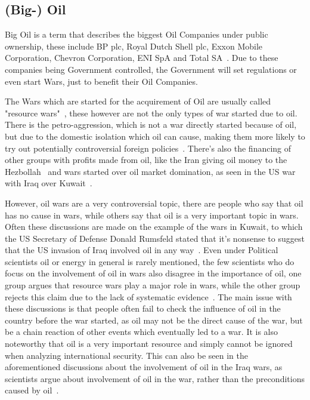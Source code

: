 \subsection{(Big-) Oil}
Big Oil is a term that describes the biggest Oil Companies under public ownership, these  include BP plc, Royal Dutch Shell plc, Exxon Mobile Corporation, Chevron Corporation, ENI SpA and Total SA~\autocite{financial-dictionary-big-oil}. Due to these companies being Government controlled, the Government will set regulations or even start Wars, just to benefit their Oil Companies.

The Wars which are started for the acquirement of Oil are usually called "resource wars"~\autocite{belfercenter-oil-conflict}, these however are not the only types of war started due to oil. There is the petro-aggression, which is not a war directly started because of oil, but due to the domestic isolation which oil can cause, making them more likely to try out potentially controversial foreign policies~\autocite{belfercenter-oil-conflict}. There's also the financing of other groups with profits made from oil, like the Iran giving oil money to the Hezbollah~\autocite{ny-times-lebanon-hezbollah-fuel} and wars started over oil market domination, as seen in the US war with Iraq over Kuwait~\autocite{britannica-persian-gulf-war}.

However, oil wars are a very controversial topic, there are people who say that oil has no cause in wars, while others say that oil is a very important topic in wars. Often these discussions are made on the example of the wars in Kuwait, to which the US Secretary of Defense Donald Rumsfeld stated that it's nonsense to suggest that the US invasion of Iraq involved oil in any way~\autocite{stokes_blood_for_oil}. Even under Political scientists oil or energy in general is rarely mentioned, the few scientists who do focus on the involvement of oil in wars also disagree in the importance of oil, one group argues that resource wars play a major role in wars, while the other group rejects this claim due to the lack of systematic evidence~\autocite{fueling-fire-jeff-d}. The main issue with these discussions is that people often fail to check the influence of oil in the country before the war started, as oil may not be the direct cause of the war, but be a chain reaction of other events which eventually led to a war. It is also noteworthy that oil is a very important resource and simply cannot be ignored when analyzing international security. This can also be seen in the aforementioned discussions about the involvement of oil in the Iraq wars, as scientists argue about involvement of oil in the war, rather than the preconditions caused by oil~\autocite{fueling-fire-jeff-d}.

